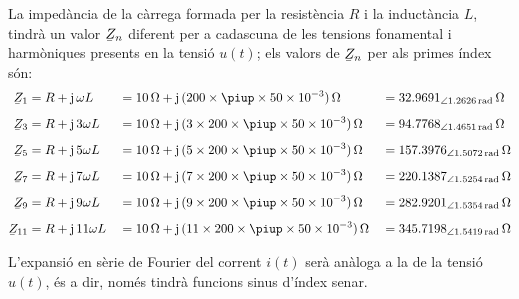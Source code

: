 \begin{exemple}
    La impedància de la càrrega formada per la resistència $R$ i la
    inductància $L$, tindrà un valor $\cmplx{Z}_n$ diferent per a
    cadascuna de les tensions fonamental i harmòniques presents en la
    tensió $u(t)$; els valors de $\cmplx{Z}_n$ per als primes índex són:
    \begin{alignat*}{3}
        \cmplx{Z}_1 &= R + \ju\, \omega L &&= \SI{10}{\ohm} + \ju\, (200\times \piup\times 50\times 10^{-3})\unit{\ohm} &&=
        \SIpr{32,9691}{1,2626}{\ohm}\\[1ex]
        \cmplx{Z}_3 &= R + \ju\, 3 \omega L &&= \SI{10}{\ohm} + \ju\, (3\times 200\times \piup\times 50\times 10^{-3})\unit{\ohm} &&=
        \SIpr{94,7768}{1,4651}{\ohm}\\[1ex]
        \cmplx{Z}_5 &= R + \ju\, 5 \omega L &&= \SI{10}{\ohm} + \ju\, (5\times 200\times \piup\times 50\times 10^{-3})\unit{\ohm} &&=
        \SIpr{157,3976}{1,5072}{\ohm}\\[1ex]
        \cmplx{Z}_7 &= R + \ju\, 7 \omega L &&= \SI{10}{\ohm} + \ju\, (7\times 200\times \piup\times 50\times 10^{-3})\unit{\ohm} &&=
        \SIpr{220,1387}{1,5254}{\ohm}\\[1ex]
        \cmplx{Z}_9 &= R + \ju\, 9 \omega L &&= \SI{10}{\ohm} + \ju\, (9\times 200\times \piup\times 50\times 10^{-3})\unit{\ohm} &&=
        \SIpr{282,9201}{1,5354}{\ohm}\\[1ex]
        \cmplx{Z}_{11} &= R + \ju\, 11 \omega L &&= \SI{10}{\ohm} + \ju\, (11\times 200\times \piup\times 50\times 10^{-3})\unit{\ohm} &&=
        \SIpr{345,7198}{1,5419}{\ohm}
    \end{alignat*}

    L'expansió en sèrie de Fourier del corrent $i(t)$ serà anàloga a la
    de la tensió $u(t)$, és a dir, només tindrà funcions sinus
    d'índex senar.


\end{exemple}
